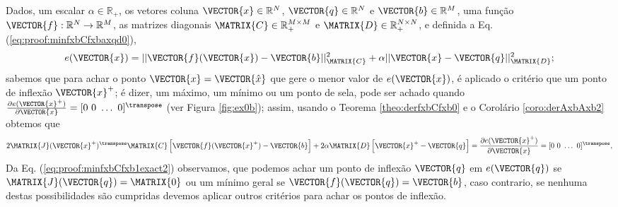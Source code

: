 \begin{myproofT}\label{proof:theo:minfxbCfxbaxqd}
Dados,
um escalar $\alpha\in \mathbb{R}_+$,
os vetores coluna $\VECTOR{x}\in \mathbb{R}^N$, 
$\VECTOR{q}\in \mathbb{R}^N$ e
$\VECTOR{b}\in \mathbb{R}^M$,  
uma função $\VECTOR{f}:\mathbb{R}^{N} \rightarrow \mathbb{R}^{M}$, 
as matrizes diagonais $\MATRIX{C} \in \mathbb{R}^{M\times M}_+$ e $\MATRIX{D} \in \mathbb{R}^{N\times N}_+$, e 
definida a Eq. (\ref{eq:proof:minfxbCfxbaxqd0}),
\begin{equation}\label{eq:proof:minfxbCfxbaxqd0}
e(\VECTOR{x})=||\VECTOR{f}(\VECTOR{x})-\VECTOR{b}||_{\MATRIX{C}}^2+\alpha||\VECTOR{x}-\VECTOR{q}||_{\MATRIX{D}}^2;
\end{equation}
sabemos que para achar o ponto $\VECTOR{x}=\VECTOR{\hat{x}}$ que gere o menor valor de $e(\VECTOR{x})$, é aplicado
o critério que um ponto de inflexão $\VECTOR{x}^+$; é dizer, um máximo, um mínimo ou um ponto de sela, pode ser achado quando 
$\frac{\partial e(\VECTOR{x}^+)}{\partial \VECTOR{x} }=[0~ 0~ \hdots~ 0 ]^{\transpose}$ (ver Figura \ref{fig:ex0b});
assim, usando o Teorema \ref{theo:derfxbCfxb0} e o Corolário \ref{coro:derAxbAxb2} obtemos que
\begin{equation}\label{eq:proof:minfxbCfxb1exact2}
2 \MATRIX{J}(\VECTOR{x}^+)^{\transpose}\MATRIX{C}\left[ \VECTOR{f}(\VECTOR{x}^+)-\VECTOR{b} \right] +
2 \alpha\MATRIX{D}\left[\VECTOR{x}^+-\VECTOR{q}\right]
=
\frac{\partial e(\VECTOR{x}^+)}{\partial \VECTOR{x} }=[0~ 0~ \hdots~ 0 ]^{\transpose},
\end{equation}
Da Eq. (\ref{eq:proof:minfxbCfxb1exact2}) observamos, 
que podemos achar um ponto de inflexão $\VECTOR{q}$
em $e(\VECTOR{q})$ se 
$\MATRIX{J}(\VECTOR{q})  = \MATRIX{0}$ ou um mínimo geral se $\VECTOR{f}(\VECTOR{q})=\VECTOR{b}$,
caso contrario, 
se nenhuma destas possibilidades são cumpridas devemos aplicar outros critérios para achar os pontos de inflexão.


\end{myproofT}
